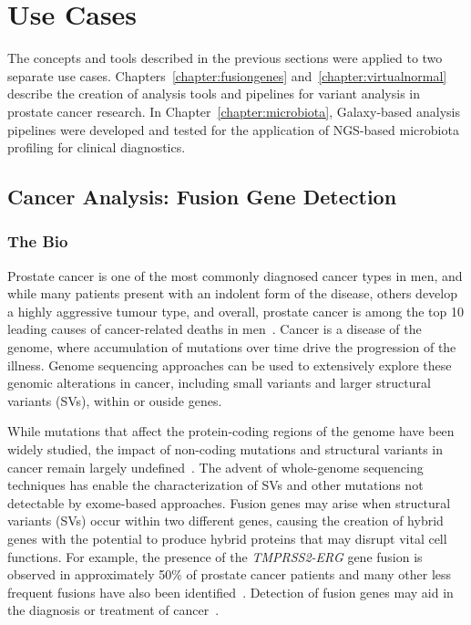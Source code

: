 \section{Use Cases}

The concepts and tools described in the previous sections were applied to two separate use cases. Chapters~\ref{chapter:fusiongenes} and~\ref{chapter:virtualnormal} describe the creation of analysis tools and pipelines for variant analysis in prostate cancer research. In Chapter~\ref{chapter:microbiota}, Galaxy-based analysis pipelines were developed and tested for the application of NGS-based microbiota profiling for clinical diagnostics.


\subsection{Cancer Analysis: Fusion Gene Detection}
\subsubsection{The Bio}

Prostate cancer is one of the most commonly diagnosed cancer types in men, and while many patients present with an indolent form of the disease, others develop a highly aggressive tumour type, and overall, prostate cancer is among the top 10 leading causes of cancer-related deaths in men~\cite{jemal2010global}. Cancer is a disease of the genome, where accumulation of mutations over time drive the progression of the illness. Genome sequencing approaches can be used to extensively explore these genomic alterations in cancer, including small variants and larger structural variants (SVs), within or ouside genes.

While mutations that affect the protein-coding regions of the genome have been widely studied, the impact of non-coding mutations and structural variants in cancer remain largely undefined~\cite{cuykendall2017non,khurana2016role}. The advent of whole-genome sequencing techniques has enable the characterization of SVs and other mutations not detectable by exome-based approaches. Fusion genes may arise when structural variants (SVs) occur within two different genes, causing the creation of hybrid genes with the potential to produce hybrid proteins that may disrupt vital cell functions.  For example, the presence of the \emph{TMPRSS2-ERG} gene fusion is observed in approximately 50\% of prostate cancer patients and many other less frequent fusions have also been identified~\cite{tomlins2005recurrent}. Detection of fusion genes may aid in the diagnosis or treatment of cancer~\cite{nowell1960chromosome,nowell1961chromosome,druker2001activity,druker2001efficacy}.

